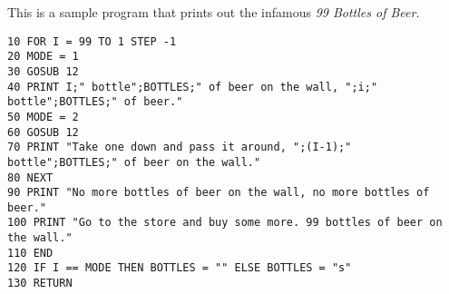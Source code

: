 This is a sample program that prints out the infamous \emph{99 Bottles of Beer}.

\begin{lstlisting}
10 FOR I = 99 TO 1 STEP -1
20 MODE = 1
30 GOSUB 12
40 PRINT I;" bottle";BOTTLES;" of beer on the wall, ";i;" bottle";BOTTLES;" of beer."
50 MODE = 2
60 GOSUB 12
70 PRINT "Take one down and pass it around, ";(I-1);" bottle";BOTTLES;" of beer on the wall."
80 NEXT
90 PRINT "No more bottles of beer on the wall, no more bottles of beer."
100 PRINT "Go to the store and buy some more. 99 bottles of beer on the wall."
110 END
120 IF I == MODE THEN BOTTLES = "" ELSE BOTTLES = "s"
130 RETURN
\end{lstlisting}

